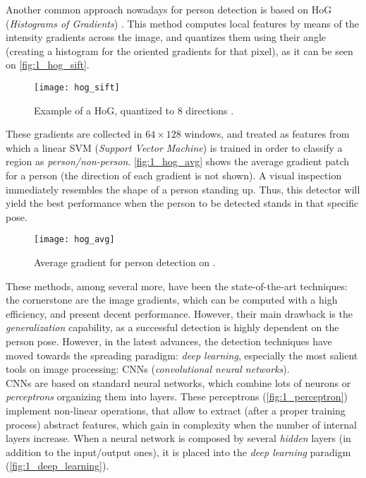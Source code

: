 Another common approach nowadays for person detection is based on HoG (\textit{Histograms of Gradients}) \cite{hog_detection}. This method computes local features by means of the intensity gradients across the image, and quantizes them using their angle (creating a histogram for the oriented gradients for that pixel), as it can be seen on \autoref{fig:1_hog_sift}.\\


\begin{figure}[h]
	\centering
	\texttt{[image: hog\_sift]}
	\caption{Example of a HoG, quantized to 8 directions \cite{diapos_cv_features}.}
	\label{fig:1_hog_sift}
\end{figure}



These gradients are collected in $64 \times 128$ windows, and treated as features from which a linear SVM (\textit{Support Vector Machine}) is trained in order to classify a region as \textit{person/non-person}. \autoref{fig:1_hog_avg} shows the average gradient patch for a person (the direction of each gradient is not shown). A visual inspection immediately resembles the shape of a person standing up. Thus, this detector will yield the best performance when the person to be detected stands in that specific pose.

\begin{figure}[h]
	\centering
	\texttt{[image: hog\_avg]}
	\caption{Average gradient for person detection on \cite{hog_detection}.}
	\label{fig:1_hog_avg}
\end{figure}

These methods, among several more, have been the state-of-the-art techniques: the cornerstone are the image gradients, which can be computed with a high efficiency,  and present decent performance. However, their main drawback is the \textit{generalization} capability, as a successful detection is highly dependent on the person pose. However, in the latest advances, the detection techniques have moved towards the spreading paradigm: \textit{deep learning}, especially the most salient tools on image processing: CNNs (\textit{convolutional neural networks}).\\

CNNs are based on standard neural networks, which combine lots of neurons or \textit{perceptrons} organizing them into layers. These perceptrons (\autoref{fig:1_perceptron}) implement non-linear operations, that allow to extract (after a proper training process) abstract features, which gain in complexity when the number of internal layers increase. When a neural network is composed by several \textit{hidden} layers (in addition to the input/output ones), it is placed into the \textit{deep learning} paradigm (\autoref{fig:1_deep_learning}).


